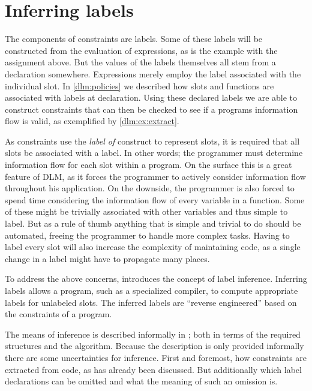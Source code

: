 
\section{Inferring labels}\label{dlm:inferring_labels}
The components of constraints are labels.
Some of these labels will be constructed from the evaluation of expressions, as is the example with the assignment above.
But the values of the labels themselves all stem from a declaration somewhere.
Expressions merely employ the label associated with the individual slot.
In \cref{dlm:policies} we described how slots and functions are associated with labels at declaration.
Using these declared labels we are able to construct constraints that can then be checked to see if a programs information flow is valid, as exemplified by \cref{dlm:ex:extract}.

As constraints use the \textit{label of} construct to represent slots, it is required that all slots be associated with a label.
In other words; the programmer must determine information flow for each slot within a program.
On the surface this is a great feature of DLM, as it forces the programmer to actively consider information flow throughout his application.
On the downside, the programmer is also forced to spend time considering the information flow of every variable in a function.
Some of these might be trivially associated with other variables and thus simple to label.
But as a rule of thumb anything that is simple and trivial to do should be automated, freeing the programmer to handle more complex tasks.
Having to label every slot will also increase the complexity of maintaining code, as a single change in a label might have to propagate many places.

To address the above concerns, \cite{myers1997} introduces the concept of label inference.
Inferring labels allows a program, such as a specialized compiler, to compute appropriate labels for unlabeled slots.
The inferred labels are ``reverse engineered'' based on the constraints of a program.

The means of inference is described informally in \cite{myers1997}; both in terms of the required structures and the algorithm.
Because the description is only provided informally there are some uncertainties for inference.
First and foremost, how constraints are extracted from code, as has already been discussed.
But additionally which label declarations can be omitted and what the meaning of such an omission is.

